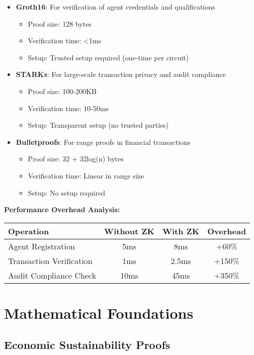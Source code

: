 \documentclass[12pt,a4paper]{article}
\begin{document}
\begin{itemize}
\item \textbf{Groth16}: For verification of agent credentials and qualifications
  \begin{itemize}
  \item Proof size: 128 bytes
  \item Verification time: <1ms
  \item Setup: Trusted setup required (one-time per circuit)
  \end{itemize}
\item \textbf{STARKs}: For large-scale transaction privacy and audit compliance
  \begin{itemize}
  \item Proof size: 100-200KB
  \item Verification time: 10-50ms
  \item Setup: Transparent setup (no trusted parties)
  \end{itemize}
\item \textbf{Bulletproofs}: For range proofs in financial transactions
  \begin{itemize}
  \item Proof size: 32 + 32log(n) bytes
  \item Verification time: Linear in range size
  \item Setup: No setup required
  \end{itemize}
\end{itemize}

\textbf{Performance Overhead Analysis:}
\begin{center}
\begin{tabular}{|l|c|c|c|}
\hline
\textbf{Operation} & \textbf{Without ZK} & \textbf{With ZK} & \textbf{Overhead} \\
\hline
Agent Registration & 5ms & 8ms & +60\% \\
Transaction Verification & 1ms & 2.5ms & +150\% \\
Audit Compliance Check & 10ms & 45ms & +350\% \\
\hline
\end{tabular}
\end{center}

\section{Mathematical Foundations}

\subsection{Economic Sustainability Proofs}
\end{document}
